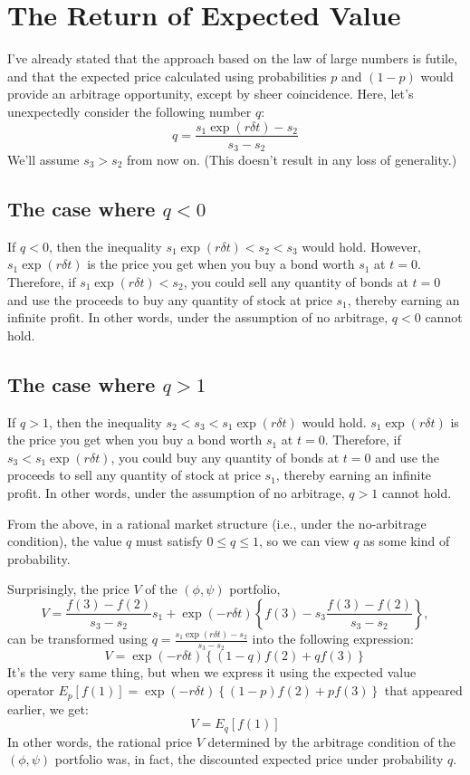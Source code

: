 \documentclass[uplatex,a4j,12pt,dvipdfmx]{jsarticle}
\begin{document}
\section{The Return of Expected Value}
I've already stated that the approach based on the law of large numbers is futile, and that the expected price calculated using probabilities $p$ and $(1-p)$ would provide an arbitrage opportunity, except by sheer coincidence. Here, let's unexpectedly consider the following number $q$:
\[q = \frac{s_1 \exp(r\delta t) - s_2}{s_3 - s_2}\]
We'll assume $s_3 > s_2$ from now on. (This doesn't result in any loss of generality.)

\subsection{The case where $q < 0$}
If $q<0$, then the inequality $s_1 \exp(r\delta t) < s_2 < s_3$ would hold. However, $s_1 \exp(r\delta t)$ is the price you get when you buy a bond worth $s_1$ at $t=0$. Therefore, if $s_1 \exp(r\delta t) < s_2$, you could sell any quantity of bonds at $t=0$ and use the proceeds to buy any quantity of stock at price $s_1$, thereby earning an infinite profit. In other words, under the assumption of no arbitrage, $q<0$ cannot hold.

\subsection{The case where $q > 1$}
If $q>1$, then the inequality $s_2 < s_3 < s_1 \exp(r\delta t)$ would hold. $s_1 \exp(r\delta t)$ is the price you get when you buy a bond worth $s_1$ at $t=0$. Therefore, if $s_3 < s_1 \exp(r\delta t)$, you could buy any quantity of bonds at $t=0$ and use the proceeds to sell any quantity of stock at price $s_1$, thereby earning an infinite profit. In other words, under the assumption of no arbitrage, $q>1$ cannot hold.

From the above, in a rational market structure (i.e., under the no-arbitrage condition), the value $q$ must satisfy $0 \le q \le 1$, so we can view $q$ as some kind of probability.

Surprisingly, the price $V$ of the $(\phi,\psi)$ portfolio,
\[V = \frac{f(3) - f(2)}{s_3 - s_2} s_1 + \exp(-r\delta t) \left\{ f(3) - s_3 \frac{f(3) - f(2)}{s_3 - s_2} \right\},\]
can be transformed using $q = \frac{s_1 \exp(r\delta t) - s_2}{s_3 - s_2}$ into the following expression:
\[V = \exp(-r\delta t) \left\{ (1-q)f(2) + qf(3) \right\}\]
It's the very same thing, but when we express it using the expected value operator $E_p[f(1)] = \exp(-r\delta t) \left\{ (1-p)f(2) + pf(3) \right\}$ that appeared earlier, we get:
\[V = E_q[f(1)]\]
In other words, the rational price $V$ determined by the arbitrage condition of the $(\phi, \psi)$ portfolio was, in fact, the discounted expected price under probability $q$.
\end{document}
